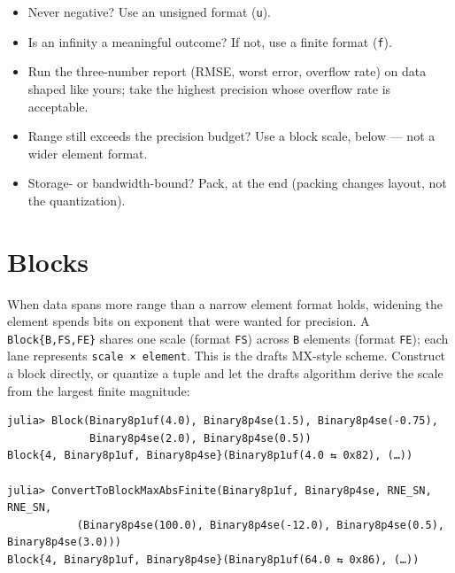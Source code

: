 \begin{itemize}
\item[1. ] Never negative? Use an unsigned format (\texttt{u}).


\item[2. ] Is an infinity a meaningful outcome? If not, use a finite format (\texttt{f}).


\item[3. ] Run the three-number report (RMSE, worst error, overflow rate) on data shaped like yours; take the highest precision whose overflow rate is acceptable.


\item[4. ] Range still exceeds the precision budget? Use a block scale, below — not a wider element format.


\item[5. ] Storage- or bandwidth-bound? Pack, at the end (packing changes layout, not the quantization).

\end{itemize}


\section{Blocks}



\label{13626648213057379036}{}


When data spans more range than a narrow element format holds, widening the element spends bits on exponent that were wanted for precision. A \texttt{Block\{B,FS,FE\}} shares one scale (format \texttt{FS}) across \texttt{B} elements (format \texttt{FE}); each lane represents \texttt{scale × element}. This is the draft{\textquotesingle}s MX-style scheme. Construct a block directly, or quantize a tuple and let the draft{\textquotesingle}s algorithm derive the scale from the largest finite magnitude:




\begin{verbatim}
julia> Block(Binary8p1uf(4.0), Binary8p4se(1.5), Binary8p4se(-0.75),
             Binary8p4se(2.0), Binary8p4se(0.5))
Block{4, Binary8p1uf, Binary8p4se}(Binary8p1uf(4.0 ⇆ 0x82), (…))

julia> ConvertToBlockMaxAbsFinite(Binary8p1uf, Binary8p4se, RNE_SN, RNE_SN,
           (Binary8p4se(100.0), Binary8p4se(-12.0), Binary8p4se(0.5), Binary8p4se(3.0)))
Block{4, Binary8p1uf, Binary8p4se}(Binary8p1uf(64.0 ⇆ 0x86), (…))
\end{verbatim}



